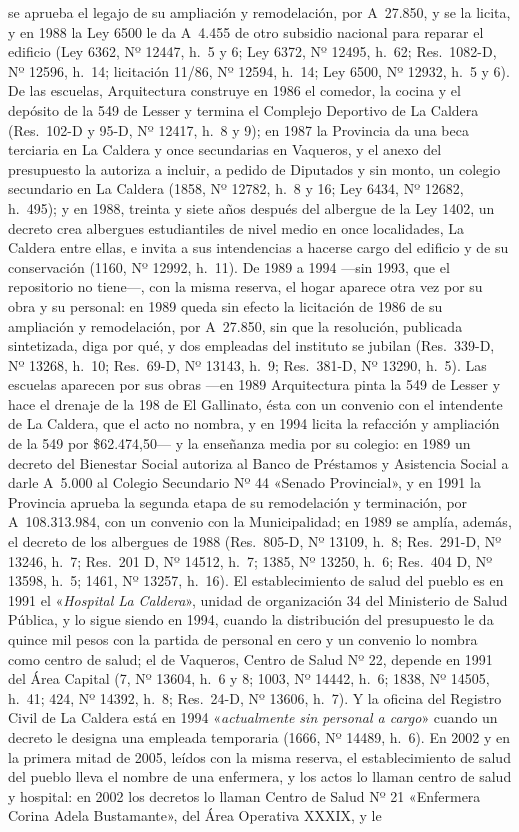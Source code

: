 se aprueba el legajo de su ampliación y remodelación, por A~27.850, y se la licita, y en 1988 la Ley 6500 le da A~4.455 de otro subsidio nacional para reparar el edificio (Ley 6362, Nº 12447, h.\ 5 y 6; Ley 6372, Nº 12495, h.\ 62; Res.\ 1082-D, Nº 12596, h.\ 14; licitación 11/86, Nº 12594, h.\ 14; Ley 6500, Nº 12932, h.\ 5 y 6). De las escuelas, Arquitectura construye en 1986 el comedor, la cocina y el depósito de la 549 de Lesser y termina el Complejo Deportivo de La Caldera (Res.\ 102-D y 95-D, Nº 12417, h.\ 8 y 9); en 1987 la Provincia da una beca terciaria en La Caldera y once secundarias en Vaqueros, y el anexo del presupuesto la autoriza a incluir, a pedido de Diputados y sin monto, un colegio secundario en La Caldera (1858, Nº 12782, h.\ 8 y 16; Ley 6434, Nº 12682, h.\ 495); y en 1988, treinta y siete años después del albergue de la Ley 1402, un decreto crea albergues estudiantiles de nivel medio en once localidades, La Caldera entre ellas, e invita a sus intendencias a hacerse cargo del edificio y de su conservación (1160, Nº 12992, h.\ 11). De 1989 a 1994 ---sin 1993, que el repositorio no tiene---, con la misma reserva, el hogar aparece otra vez por su obra y su personal: en 1989 queda sin efecto la licitación de 1986 de su ampliación y remodelación, por A~27.850, sin que la resolución, publicada sintetizada, diga por qué, y dos empleadas del instituto se jubilan (Res.\ 339-D, Nº 13268, h.\ 10; Res.\ 69-D, Nº 13143, h.\ 9; Res.\ 381-D, Nº 13290, h.\ 5). Las escuelas aparecen por sus obras ---en 1989 Arquitectura pinta la 549 de Lesser y hace el drenaje de la 198 de El Gallinato, ésta con un convenio con el intendente de La Caldera, que el acto no nombra, y en 1994 licita la refacción y ampliación de la 549 por \$62.474,50--- y la enseñanza media por su colegio: en 1989 un decreto del Bienestar Social autoriza al Banco de Préstamos y Asistencia Social a darle A~5.000 al Colegio Secundario Nº 44 «Senado Provincial», y en 1991 la Provincia aprueba la segunda etapa de su remodelación y terminación, por A~108.313.984, con un convenio con la Municipalidad; en 1989 se amplía, además, el decreto de los albergues de 1988 (Res.\ 805-D, Nº 13109, h.\ 8; Res.\ 291-D, Nº 13246, h.\ 7; Res.\ 201 D, Nº 14512, h.\ 7; 1385, Nº 13250, h.\ 6; Res.\ 404 D, Nº 13598, h.\ 5; 1461, Nº 13257, h.\ 16). El establecimiento de salud del pueblo es en 1991 el «\textit{Hospital La Caldera}», unidad de organización 34 del Ministerio de Salud Pública, y lo sigue siendo en 1994, cuando la distribución del presupuesto le da quince mil pesos con la partida de personal en cero y un convenio lo nombra como centro de salud; el de Vaqueros, Centro de Salud Nº 22, depende en 1991 del Área Capital (7, Nº 13604, h.\ 6 y 8; 1003, Nº 14442, h.\ 6; 1838, Nº 14505, h.\ 41; 424, Nº 14392, h.\ 8; Res.\ 24-D, Nº 13606, h.\ 7). Y la oficina del Registro Civil de La Caldera está en 1994 «\textit{actualmente sin personal a cargo}» cuando un decreto le designa una empleada temporaria (1666, Nº 14489, h.\ 6). En 2002 y en la primera mitad de 2005, leídos con la misma reserva, el establecimiento de salud del pueblo lleva el nombre de una enfermera, y los actos lo llaman centro de salud y hospital: en 2002 los decretos lo llaman Centro de Salud Nº 21 «Enfermera Corina Adela Bustamante», del Área Operativa XXXIX, y le 